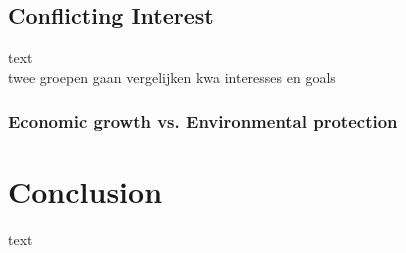 \subsection{Conflicting Interest}
text
\\
twee groepen gaan vergelijken kwa interesses en goals 

\subsubsection{Economic growth vs. Environmental protection}

\section{Conclusion}
text







